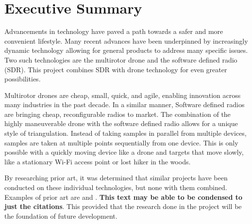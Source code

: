 \chapter*{Executive Summary}
Advancements in technology have paved a path towards a safer and more convenient lifestyle. Many recent advances have been underpinned by increasingly dynamic technology allowing for general products to address many specific issues. Two such technologies are the multirotor drone and the software defined radio (SDR). This project combines SDR with drone technology for even greater possibilities. \par

Multirotor drones are cheap, small, quick, and agile, enabling innovation across many industries in the past decade. In a similar manner, Software defined radios are bringing cheap, reconfigurable radios to market. The combination of the highly maneuverable drone with the software defined radio allows for a unique style of triangulation. Instead of taking samples in parallel from multiple devices, samples are taken at multiple points sequentially from one device. This is only possible with a quickly moving device like a drone and targets that move slowly, like a stationary Wi-Fi access point or lost hiker in the woods. \par

By researching prior art, it was determined that similar projects have been conducted on these individual technologies, but none with them combined. Examples of prior art are \cite{path_planning_snr_mqp} and \cite{sdr_localization_mqp}. \textbf{This text may be able to be condensed to just the citations}. This provided that the research done in the project will be the foundation of future development. \par

